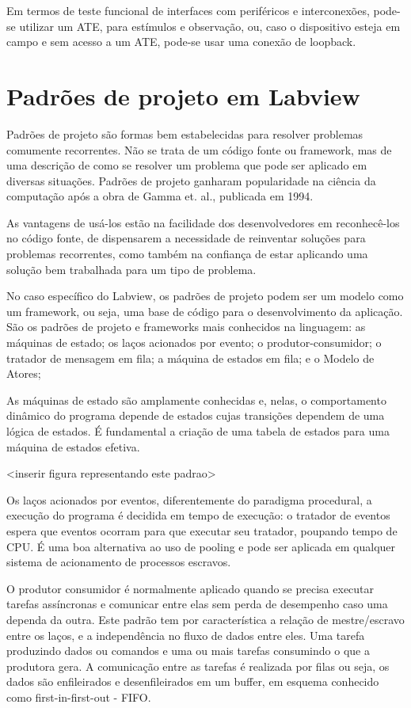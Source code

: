 Em termos de teste funcional de interfaces com periféricos e interconexões, pode-se utilizar um ATE, para estímulos e observação, ou, caso o dispositivo esteja em campo e sem acesso a um ATE, pode-se usar uma conexão de loopback.

\section{Padrões de projeto em Labview}


Padrões de projeto são formas bem estabelecidas para resolver problemas comumente recorrentes. Não se trata de um código fonte ou framework, mas de uma descrição de como se resolver um problema que pode ser aplicado em diversas situações. Padrões de projeto ganharam popularidade na ciência da computação após a obra de Gamma et. al.\cite{gamma}, publicada em 1994. 

As vantagens de usá-los estão na facilidade dos desenvolvedores em reconhecê-los no código fonte, de dispensarem a necessidade de reinventar soluções para problemas recorrentes, como também na confiança de estar aplicando uma solução bem trabalhada para um tipo de problema.

No caso específico do Labview, os padrões de projeto podem ser um modelo como um framework, ou seja, uma base de código para o desenvolvimento da aplicação. São os padrões de projeto e frameworks mais conhecidos na linguagem: as máquinas de estado; os laços acionados por evento; o produtor-consumidor; o tratador de mensagem em fila; a máquina de estados em fila; e o Modelo de Atores;

As máquinas de estado são amplamente conhecidas e, nelas, o comportamento dinâmico do programa depende de estados cujas transições dependem de uma lógica de estados. É fundamental a criação de uma tabela de estados para uma máquina de estados efetiva.

<inserir figura representando este padrao>

Os laços acionados por eventos, diferentemente do paradigma procedural, a execução do programa é decidida em tempo de execução: o tratador de eventos espera que eventos ocorram para que executar seu tratador, poupando tempo de CPU. É uma boa alternativa ao uso de pooling e pode ser aplicada em qualquer sistema de acionamento de processos escravos.


O produtor consumidor é normalmente aplicado quando se precisa executar tarefas assíncronas e comunicar entre elas sem perda de desempenho caso uma dependa da outra. Este padrão tem por característica a relação de mestre/escravo entre os laços, e a independência no fluxo de dados entre eles. Uma tarefa produzindo dados ou comandos e uma ou mais tarefas consumindo o que a produtora gera. A comunicação entre as tarefas é realizada por filas ou seja, os dados são enfileirados e desenfileirados em um buffer, em esquema conhecido como first-in-first-out - FIFO.

